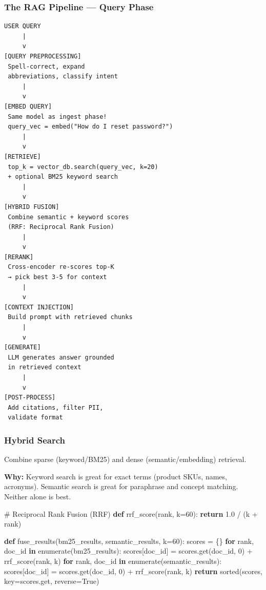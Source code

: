 \documentclass[11pt]{article}
\newenvironment{Shaded}{\begin{snugshade}}{\end{snugshade}}
\newcommand{\BuiltInTok}[1]{\textcolor[rgb]{0.50,0.55,0.55}{#1}}
\newcommand{\CommentTok}[1]{\textcolor[rgb]{0.48,0.49,0.49}{#1}}
\newcommand{\ControlFlowTok}[1]{\textcolor[rgb]{0.99,0.74,0.29}{\textbf{#1}}}
\newcommand{\DecValTok}[1]{\textcolor[rgb]{0.96,0.45,0.00}{#1}}
\newcommand{\FloatTok}[1]{\textcolor[rgb]{0.96,0.45,0.00}{#1}}
\newcommand{\KeywordTok}[1]{\textcolor[rgb]{0.81,0.81,0.76}{\textbf{#1}}}
\newcommand{\NormalTok}[1]{\textcolor[rgb]{0.81,0.81,0.76}{#1}}
\newcommand{\OperatorTok}[1]{\textcolor[rgb]{0.81,0.81,0.76}{#1}}
\newcommand{\VariableTok}[1]{\textcolor[rgb]{0.15,0.68,0.68}{#1}}
\begin{document}
\subsubsection{The RAG Pipeline --- Query Phase}\label{the-rag-pipeline--query-phase}

\setcodelang{}

\begin{verbatim}
USER QUERY
     |
     v
[QUERY PREPROCESSING]
 Spell-correct, expand
 abbreviations, classify intent
     |
     v
[EMBED QUERY]
 Same model as ingest phase!
 query_vec = embed("How do I reset password?")
     |
     v
[RETRIEVE]
 top_k = vector_db.search(query_vec, k=20)
 + optional BM25 keyword search
     |
     v
[HYBRID FUSION]
 Combine semantic + keyword scores
 (RRF: Reciprocal Rank Fusion)
     |
     v
[RERANK]
 Cross-encoder re-scores top-K
 → pick best 3-5 for context
     |
     v
[CONTEXT INJECTION]
 Build prompt with retrieved chunks
     |
     v
[GENERATE]
 LLM generates answer grounded
 in retrieved context
     |
     v
[POST-PROCESS]
 Add citations, filter PII,
 validate format
\end{verbatim}

\subsubsection{Hybrid Search}\label{hybrid-search}

Combine sparse (keyword/BM25) and dense (semantic/embedding) retrieval.

\textbf{Why:} Keyword search is great for exact terms (product SKUs, names, acronyms). Semantic search is great for paraphrase and concept matching. Neither alone is best.


\begin{Shaded}
\begin{Highlighting}[]
\CommentTok{\# Reciprocal Rank Fusion (RRF)}
\KeywordTok{def}\NormalTok{ rrf\_score(rank, k}\OperatorTok{=}\DecValTok{60}\NormalTok{):}
    \ControlFlowTok{return} \FloatTok{1.0} \OperatorTok{/}\NormalTok{ (k }\OperatorTok{+}\NormalTok{ rank)}

\KeywordTok{def}\NormalTok{ fuse\_results(bm25\_results, semantic\_results, k}\OperatorTok{=}\DecValTok{60}\NormalTok{):}
\NormalTok{    scores }\OperatorTok{=}\NormalTok{ \{\}}
    \ControlFlowTok{for}\NormalTok{ rank, doc\_id }\KeywordTok{in} \BuiltInTok{enumerate}\NormalTok{(bm25\_results):}
\NormalTok{        scores[doc\_id] }\OperatorTok{=}\NormalTok{ scores.get(doc\_id, }\DecValTok{0}\NormalTok{) }\OperatorTok{+}\NormalTok{ rrf\_score(rank, k)}
    \ControlFlowTok{for}\NormalTok{ rank, doc\_id }\KeywordTok{in} \BuiltInTok{enumerate}\NormalTok{(semantic\_results):}
\NormalTok{        scores[doc\_id] }\OperatorTok{=}\NormalTok{ scores.get(doc\_id, }\DecValTok{0}\NormalTok{) }\OperatorTok{+}\NormalTok{ rrf\_score(rank, k)}
    \ControlFlowTok{return} \BuiltInTok{sorted}\NormalTok{(scores, key}\OperatorTok{=}\NormalTok{scores.get, reverse}\OperatorTok{=}\VariableTok{True}\NormalTok{)}
\end{Highlighting}
\end{Shaded}
\end{document}
